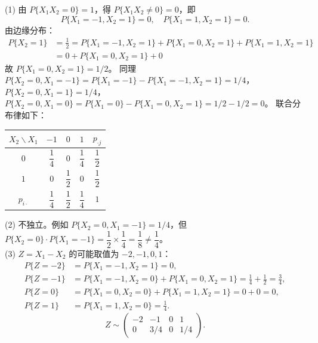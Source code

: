 \documentclass[lang=cn,11pt]{elegantbook}
\begin{document}
\begin{solution}
(1) 由 $P\{X_1 X_2 = 0\} = 1$，得 $P\{X_1 X_2 \neq 0\} = 0$，即
\[
P\{X_1 = -1, X_2 = 1\} = 0, \quad P\{X_1 = 1, X_2 = 1\} = 0.
\]
由边缘分布：
\begin{align*}
    P\{X_2 = 1\} &= \frac{1}{2} = P\{X_1=-1,X_2=1\} + P\{X_1=0,X_2=1\} + P\{X_1=1,X_2=1\} \\
    &= 0 + P\{X_1=0,X_2=1\} + 0
\end{align*}
故 $P\{X_1=0, X_2=1\} = 1/2$。
同理 $P\{X_2=0,X_1=-1\} = P\{X_1=-1\} - P\{X_1=-1,X_2=1\} = 1/4$，
$P\{X_2=0,X_1=1\} = 1/4$，
$P\{X_2=0,X_1=0\} = P\{X_1=0\} - P\{X_1=0,X_2=1\} = 1/2 - 1/2 = 0$。
联合分布律如下：
\begin{center}
\begin{tabular}{c|ccc|c}
\toprule
$X_2 \backslash X_1$ & $-1$ & $0$ & $1$ & $p_{\cdot j}$ \\
\midrule
$0$ & $\dfrac{1}{4}$ & $0$ & $\dfrac{1}{4}$ & $\dfrac{1}{2}$ \\[6pt]
$1$ & $0$ & $\dfrac{1}{2}$ & $0$ & $\dfrac{1}{2}$ \\
\midrule
$p_{i\cdot}$ & $\dfrac{1}{4}$ & $\dfrac{1}{2}$ & $\dfrac{1}{4}$ & $1$ \\
\bottomrule
\end{tabular}
\end{center}
(2) 不独立。例如 $P\{X_2=0, X_1=-1\} = 1/4$，但 $P\{X_2=0\} \cdot P\{X_1=-1\} = \dfrac{1}{2} \times \dfrac{1}{4} = \dfrac{1}{8} \neq \dfrac{1}{4}$。\\
(3) $Z = X_1 - X_2$ 的可能取值为 $-2, -1, 0, 1$：
\begin{align*}
P\{Z = -2\} &= P\{X_1 = -1, X_2 = 1\} = 0, \\
P\{Z = -1\} &= P\{X_1 = -1, X_2 = 0\} + P\{X_1 = 0, X_2 = 1\} = \frac{1}{4} + \frac{1}{2} = \frac{3}{4}, \\
P\{Z = 0\} &= P\{X_1 = 0, X_2 = 0\} + P\{X_1 = 1, X_2 = 1\} = 0 + 0 = 0, \\
P\{Z = 1\} &= P\{X_1 = 1, X_2 = 0\} = \frac{1}{4}.
\end{align*}
\[
Z \sim \begin{pmatrix} -2 & -1 & 0 & 1 \\ 0 & 3/4 & 0 & 1/4 \end{pmatrix}.
\]
\end{solution}
\end{document}
